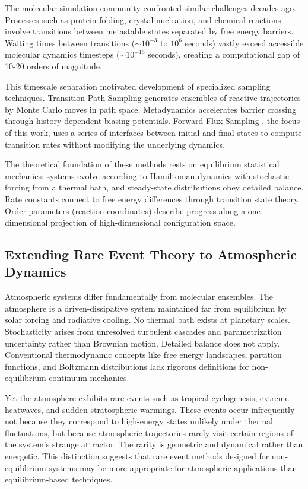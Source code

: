 \documentclass[11pt]{article}
\begin{document}
The molecular simulation community confronted similar challenges decades ago. Processes such as protein folding, crystal nucleation, and chemical reactions involve transitions between metastable states separated by free energy barriers. Waiting times between transitions ($\sim 10^{-3}$ to $10^6$ seconds) vastly exceed accessible molecular dynamics timesteps ($\sim 10^{-15}$ seconds), creating a computational gap of 10-20 orders of magnitude.

This timescale separation motivated development of specialized sampling techniques. Transition Path Sampling \citep{bolhuis2002transition} generates ensembles of reactive trajectories by Monte Carlo moves in path space. Metadynamics \citep{laio2002escaping} accelerates barrier crossing through history-dependent biasing potentials. Forward Flux Sampling \citep{allen2006forward,allen2009forward}, the focus of this work, uses a series of interfaces between initial and final states to compute transition rates without modifying the underlying dynamics.

The theoretical foundation of these methods rests on equilibrium statistical mechanics: systems evolve according to Hamiltonian dynamics with stochastic forcing from a thermal bath, and steady-state distributions obey detailed balance. Rate constants connect to free energy differences through transition state theory. Order parameters (reaction coordinates) describe progress along a one-dimensional projection of high-dimensional configuration space.

\subsection{Extending Rare Event Theory to Atmospheric Dynamics}

Atmospheric systems differ fundamentally from molecular ensembles. The atmosphere is a driven-dissipative system maintained far from equilibrium by solar forcing and radiative cooling. No thermal bath exists at planetary scales. Stochasticity arises from unresolved turbulent cascades and parametrization uncertainty rather than Brownian motion. Detailed balance does not apply. Conventional thermodynamic concepts like free energy landscapes, partition functions, and Boltzmann distributions lack rigorous definitions for non-equilibrium continuum mechanics.

Yet the atmosphere exhibits rare events such as tropical cyclogenesis, extreme heatwaves, and sudden stratospheric warmings. These events occur infrequently not because they correspond to high-energy states unlikely under thermal fluctuations, but because atmospheric trajectories rarely visit certain regions of the system's strange attractor. The rarity is geometric and dynamical rather than energetic. This distinction suggests that rare event methods designed for non-equilibrium systems may be more appropriate for atmospheric applications than equilibrium-based techniques.
\end{document}
